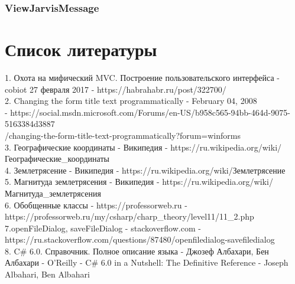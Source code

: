 \documentclass[a4paper,12pt, fleqn]{article}
\theoremstyle{plain} %
\theoremstyle{definition} %
\theoremstyle{remark} %
\numberwithin{equation}{section}
\begin{document}
\subsubsection{ViewJarvisMessage}
%
%
%
%
%

\newpage
\section{Список литературы}

1. Охота на мифический MVC. Построение пользовательского интерфейса - cobiot
27 февраля 2017 - https://habrahabr.ru/post/322700/\\
2. Changing the form title text programmatically - February 04, 2008\\ - https://social.msdn.microsoft.com/Forums/en-US/b958c565-94bb-464d-9075-5163384d3887\\/changing-the-form-title-text-programmatically?forum=winforms\\
3. Географические координаты - Википедия - https://ru.wikipedia.org/wiki/\\Географические\_координаты\\
4. Землетрясение - Википедия - https://ru.wikipedia.org/wiki/Землетрясение\\
5. Магнитуда землетрясения - Википедия - https://ru.wikipedia.org/wiki/\\Магнитуда\_землетрясения\\
6. Обобщенные классы - https://professorweb.ru -\\ https://professorweb.ru/my/csharp/charp\_theory/level11/11\_2.php\\
7.openFileDialog, saveFileDialog - stackoverflow.com - \\ https://ru.stackoverflow.com/questions/87480/openfiledialog-savefiledialog\\
8. C# 6.0. Справочник. Полное описание языка - Джозеф Албахари, Бен Албахари - O’Reilly - C# 6.0 in a Nutshell: The Definitive Reference - Joseph Albahari, Ben Albahari
\end{document}
